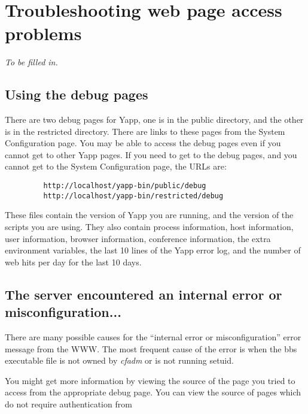\documentclass[twoside]{report}
\begin{document}
   \section{Troubleshooting web page access problems}
      {\em To be filled in.}


      \subsection{Using the debug pages} \label {s:debug}
         There are two debug pages for Yapp, one is in the public 
         directory, and the other is in the restricted directory.  There are 
         links to these pages from the System Configuration page.  You may be 
         able to access the debug pages even if you cannot get to other Yapp 
         pages.  If you need to get to the debug pages, and you cannot get to 
         the System Configuration page, the URLs are:
         \begin{verbatim}
         http://localhost/yapp-bin/public/debug
         http://localhost/yapp-bin/restricted/debug
         \end{verbatim}
         \vspace{-12pt}
   
         These files contain the  version of Yapp you are running, and the 
         version of the scripts you are using.  They also contain process 
         information, host information, user information, browser information, 
         conference information, the extra environment variables, the last 10 
         lines of the Yapp error log, and the number of web hits per day for 
         the last 10 days.


         

      \subsection{The server encountered an internal error or misconfiguration...}
         There are many possible causes for the ``internal error or 
         misconfiguration'' error message from the WWW.  The most frequent
         cause of the error is when the bbs executable file is not owned
         by {\em cfadm} or is not running setuid.

         You might get more information by viewing the source of the page 
         you tried to access from the appropriate debug page.  
         You can view the source of pages which do not require authentication 
         from 
\end{document}
